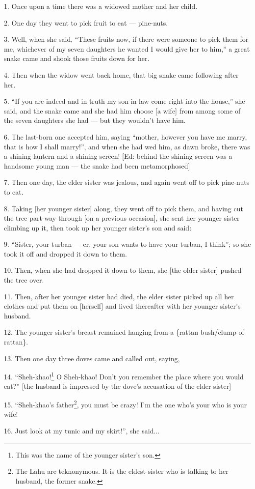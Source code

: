 \setcounter{footnote}{0}

1. Once upon a time there was a widowed mother and her child.

2. One day they went to pick fruit to eat --- pine-nuts.

3. Well, when she said, ``These fruits now, if there were someone to pick them for
me, whichever of my seven daughters he wanted I would give her to him,'' a great
snake came and shook those fruits down for her.

4. Then when the widow went back home, that big snake came following after her.

5. ``If you are indeed and in truth my son-in-law come right into the house,'' she
said, and the snake came and she had him choose [a wife] from among some of the
seven daughters she had --- but they wouldn't have him.

6. The last-born one accepted him, saying ``mother, however you have me marry, that
is how I shall marry!'', and when she had wed him, as dawn broke, there was a shining
lantern and a shining screen! [Ed: behind the shining screen was a handsome young
man --- the snake had been metamorphosed]

7. Then one day, the elder sister was jealous, and again went off to pick pine-nuts
to eat.

8. Taking [her younger sister] along, they went off to pick them, and having cut
the tree part-way through [on a previous occasion], she sent her younger sister
climbing up it, then took up her younger sister's son and said:

9. ``Sister, your turban --- er, your son wants to have your turban, I think'';
so she took it off and dropped it down to them.

10. Then, when she had dropped it down to them, she [the older sister] pushed the
tree over.

11. Then, after her younger sister had died, the elder sister picked up all her
clothes and put them on [herself] and lived thereafter with her younger sister's
husband.

12. The younger sister's breast remained hanging from a \{rattan bush/clump of rattan\}.

13. Then one day three doves came and called out, saying,

14. ``Sheh-khao!\footnote{This was the name of the younger sister's son.} O Sheh-khao! Don't you remember the place where you would eat?''
[the husband is impressed by the dove's accusation of the elder sister]

15. ``Sheh-khao's father\footnote{The Lahu are teknonymous. It is the eldest sister who is talking to her husband, the former snake.}, you must be crazy! I'm the one who's your who is your
wife!

16. Just look at my tunic and my skirt!'', she said...


